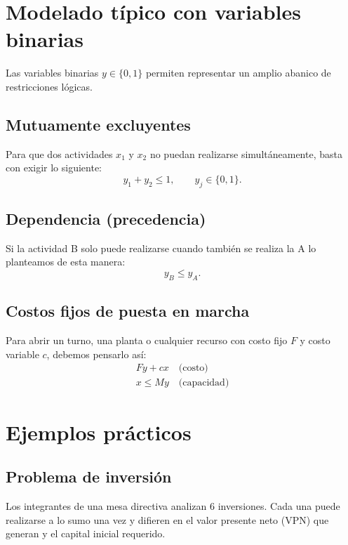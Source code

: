 \documentclass[12pt]{article}
\begin{document}
\section{Modelado típico con variables binarias}
Las variables binarias $y \in \{0,1\}$ permiten representar un amplio abanico de restricciones lógicas.

\subsection{Mutuamente excluyentes}
Para que dos actividades $x_1$ y $x_2$ no puedan realizarse simultáneamente, basta con exigir lo siguiente:
\begin{equation*}
    y_1 + y_2 \le 1, \qquad y_j \in \{0,1\}.
\end{equation*}

\subsection{Dependencia (precedencia)}
Si la actividad B solo puede realizarse cuando también se realiza la A lo planteamos de esta manera:
\begin{equation*}
    y_B \le y_A.
\end{equation*}

\subsection{Costos fijos de puesta en marcha}
Para abrir un turno, una planta o cualquier recurso con costo fijo $F$ y costo variable $c$, debemos pensarlo así:
\begin{align*}
    F y + c x \quad \text{(costo)} \\
    x \le M y \quad \text{(capacidad)}
\end{align*}

\section{Ejemplos prácticos}

\subsection{Problema de inversión}
Los integrantes de una mesa directiva analizan 6 inversiones. Cada una puede realizarse a lo sumo una vez y difieren en el valor presente neto (VPN) que generan y el capital inicial requerido.
\end{document}
